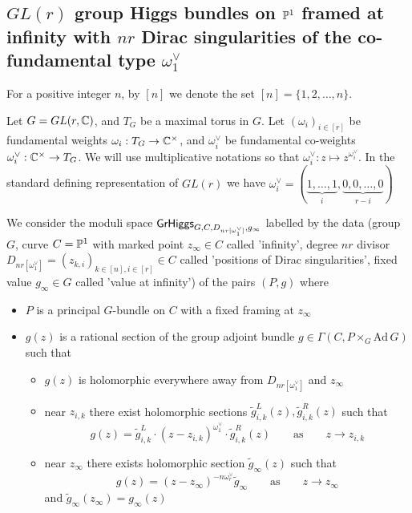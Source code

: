 \documentclass[12pt,psamsfonts,reqno]{amsart}
\begin{document}
\begin{remark}
 




\subsection{ $GL(r)$ group Higgs bundles on $\mathbb P^1$ framed at infinity with $nr$ Dirac
 singularities of the co-fundamental type $\omega_1^{\vee}$}

For a positive  integer $n$, by $[n]$ we denote the set $[n] = \{1,2,\dots, n \}$.


Let $G = GL(r, \mathbb C)$, and $T_{G}$ be a maximal torus in $G$.
Let $(\omega_i)_{i \in [r]}$ be fundamental weights $\omega_i: T_{G} \to \mathbb C^{\times}$,
and $\omega_i^{\vee}$ be fundamental co-weights $\omega_i^{\vee}: \mathbb C^{\times} \to T_{G}$. We will use
multiplicative notations so that $\omega_i^{\vee}: z \mapsto z^{\omega_{i}^{\vee}}$.
In the standard defining representation of $GL(r)$ we have  $\omega_i^{\vee} = (\underbrace{1, \dots, 1}_{i},
\underbrace{0, 0, \dots, 0}_{r-i})$



\begin{definition} \label{de:GLrn}
  
  We consider the moduli space $\mathsf{GrHiggs}_{G,C,D_{nr[\omega_1^{\vee}]},g_\infty}$  
  labelled by the data (group $G$, curve $C = \mathbb P^1$ with marked point $z_\infty \in C$ called 'infinity',
  degree $nr$ divisor $D_{nr[\omega_1^{\vee}]} = (z_{k,i})_{k \in [n], i \in [r]} \in C$ called
  'positions of Dirac singularities', fixed value $g_{\infty} \in G$ called 'value at infinity') of the pairs
  $(P,g)$ where 
\begin{itemize}
\item $P$ is a principal $G$-bundle on $C$ with a fixed framing at $z_{\infty}$
\item $g(z)$ is a rational section of the group adjoint bundle $g \in \Gamma(C, P \times_{G} \mathrm{Ad} \, G)$
  such that 
  \begin{itemize}
  \item $g(z)$ is holomorphic everywhere away from $D_{nr[\omega_1^{\vee}]}$ and $z_\infty$
  \item near $z_{i,k}$ there exist holomorphic sections $\tilde g_{i,k}^{L}(z), \tilde g_{i,k}^{R}(z) $ such that
    \begin{equation}
     g(z) = \tilde g_{i,k}^{L} \cdot (z - z_{i,k})^{\omega_1^{\vee}} \cdot \tilde g_{i,k}^{R} (z) \qquad \text{as} \qquad z \to z_{i,k}
    \end{equation}
 \item near $z_{\infty}$ there exists holomorphic section $\tilde g_{\infty}(z)$
   such that 
   \begin{equation}
     g(z) = (z-z_{\infty})^{-n \omega_{r}^{\vee}} \tilde g_{\infty} \qquad \text{as} \qquad z \to z_\infty
   \end{equation}
   and $\tilde g_\infty(z_{\infty}) = g_\infty(z)$
  \end{itemize}
\end{itemize}
\end{definition}



\end{remark}
\end{document}
